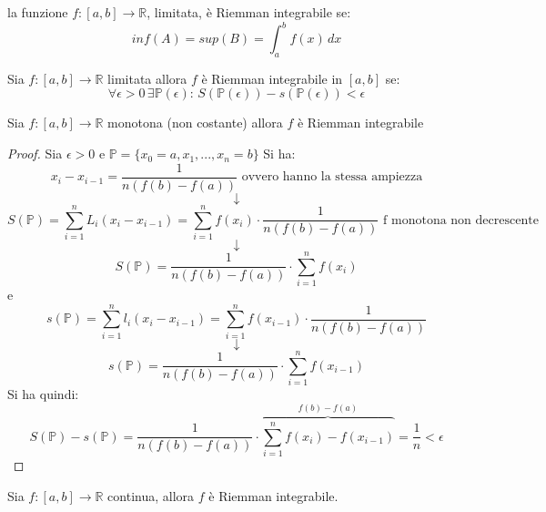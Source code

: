 \documentclass[a4paper,12pt, oneside]{book}
\begin{document}
\begin{definizione}
la funzione $f:[a,b]\rightarrow\mathbb{R}$, limitata, è Riemman integrabile se:$$inf(A)=sup(B)=\int_{a}^{b}f(x)\,dx$$
\end{definizione}
\newpage
\begin{teorema}
Sia $f:[a,b]\rightarrow\mathbb{R}$ limitata allora $f$ è Riemman integrabile in $[a,b]$ se:
$$\forall\epsilon>0	\, \exists\mathbb{P}(\epsilon):\, S(\mathbb{P}(\epsilon))-s(\mathbb{P}(\epsilon))<\epsilon$$
\end{teorema}
\begin{teorema}
Sia $f:[a,b]\rightarrow\mathbb{R}$ monotona (non costante) allora $f$ è Riemman integrabile
\end{teorema}
\begin{proof}
Sia $\epsilon>0$ e $\mathbb{P}=\{x_0=a,x_1,...,x_n=b\}$ Si ha:
$$x_i-x_{i-1}=\frac{1}{n(f(b)-f(a))} \mbox{ ovvero hanno la stessa ampiezza}$$
$$\downarrow$$
$$S(\mathbb{P})= \sum_{i=1}^{n} L_i(x_i-x_{i-1})=\sum_{i=1}^{n}f(x_i)\cdot \frac{1}{n(f(b)-f(a))} \mbox{ f monotona non decrescente}$$
$$\downarrow$$
$$S(\mathbb{P})=\frac{1}{n(f(b)-f(a))}\cdot\sum_{i=1}^{n}f(x_i)$$
e
$$s(\mathbb{P})= \sum_{i=1}^{n} l_i(x_i-x_{i-1})=\sum_{i=1}^{n}f(x_{i-1})\cdot \frac{1}{n(f(b)-f(a))}$$
$$\downarrow$$
$$s(\mathbb{P})=\frac{1}{n(f(b)-f(a))}\cdot\sum_{i=1}^{n}f(x_{i-1})$$
Si ha quindi:
$$S(\mathbb{P})-s(\mathbb{P})=\frac{1}{n(f(b)-f(a))}\cdot\overbrace{\sum_{i=1}^{n}f(x_i)-f(x_{i-1})}^{f(b)-f(a)}=\frac{1}{n}<\epsilon$$
\end{proof}
\begin{teorema}
Sia $f:[a,b]\rightarrow\mathbb{R}$ continua, allora $f$ è Riemman integrabile.
\end{teorema}
\newpage
\end{document}
